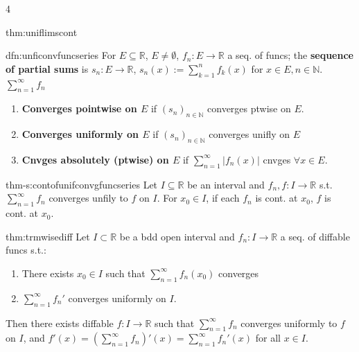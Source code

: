\documentclass[landscape, 8pt]{extarticle}
\begin{document}
\begin{multicols*}{4}
\begin{thm}{thm:uniflimscont}{ }
		\end{thm}
		
		
		\begin{dfn}{dfn:unficonvfuncseries}{ }
		For $E \subseteq \mathbb{R}$, $E \ne \emptyset$, $f_n : E \to \mathbb{R}$ a seq. of funcs; the \textbf{sequence of partial sums} is $s_n: E \to \mathbb{R}$, $s_n(x) := \sum_{k=1}^{n}f_k(x)$ for $x\in E, n\in \mathbb{N}$. $\sum_{n=1}^{\infty}f_n$
		\begin{enumerate}[label=(\arabic*)]
			\item \textbf{Converges pointwise on $E$} if $(s_n)_{n\in \mathbb{N}}$ converges ptwise on $E$.
			\item \textbf{Converges uniformly on $E$} if $(s_n)_{n\in \mathbb{N}}$ converges unifly on $E$
			\item \textbf{Cnvges absolutely (ptwise) on $E$} if $\sum_{n=1}^{\infty}\left|f_n(x)\right|$ cnvges $\forall x\in E$.
		\end{enumerate}
		
		\end{dfn}
		
		
		\begin{thm-s}{thm-s:contofunifconvgfuncseries}{ }
		Let $I \subseteq \mathbb{R}$ be an interval and $f_n, f : I \to \mathbb{R}$ s.t. $\sum_{n=1}^{\infty}f_n$ converges unfily to $f$ on $I$. For $x_0\in I$, if each $f_n$ is cont. at $x_0$, $f$ is cont. at $x_0$.
		
		\end{thm-s}
		
		
		\begin{thm}{thm:trmwisediff}{ }
		Let $I \subset \mathbb{R}$ be a bdd open interval and $f_n: I \to \mathbb{R}$ a seq. of diffable funcs s.t.:
		\begin{enumerate}[label=(\arabic*)]
			\item There exists $x_0\in I$ such that $\sum_{n=1}^{\infty}f_n(x_0)$ converges
			\item $\sum_{n=1}^{\infty}f_n'$ converges uniformly on $I$.
		\end{enumerate}
		Then there exists diffable $f : I \to \mathbb{R}$ such that $\sum_{n=1}^{\infty}f_n$ converges uniformly to $f$ on $I$, and $f'(x) = \left(\sum_{n=1}^{\infty}f_n\right)'(x) = \sum_{n=1}^{\infty}f_n'(x)$ for all $x\in I$.
		
		\end{thm}
		

\end{multicols*}
\end{document}
